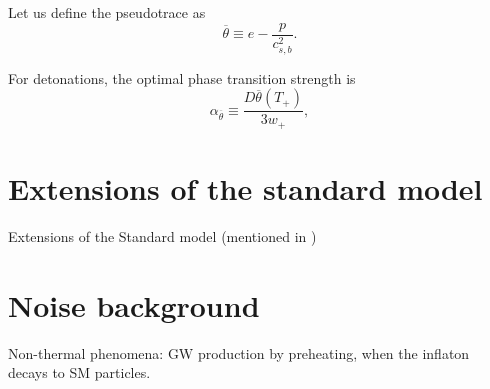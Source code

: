 Let us define the pseudotrace as
\cites[eq. 34]{giese_2020}[eq. 1]{giese_2021}
\begin{equation}
\overline{\theta} \equiv e - \frac{p}{c_{s,b}^2}.
\end{equation}

For detonations, the optimal phase transition strength is
\cites[eq. 34]{giese_2020}[eq. 1]{giese_2021}
\begin{equation}
\alpha_{\overline{\theta}} \equiv \frac{D \overline{\theta}(T_+)}{3w_+},
\end{equation}


\section{Extensions of the standard model}
Extensions of the Standard model \cite{caprini_detecting_2020}
(mentioned in \cite[p. 14]{lecture_notes})

\section{Noise background}
Non-thermal phenomena: GW production by preheating, when the inflaton decays to SM particles.
\cite{lecture_notes}
